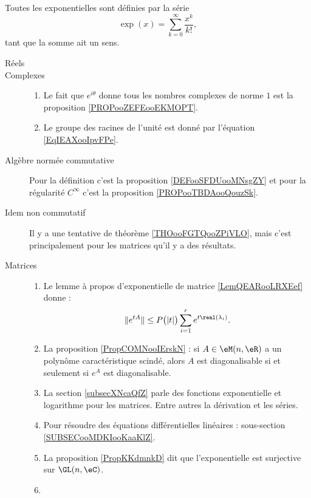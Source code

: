        \label{THEMEooKXSGooCsQNoY}

Toutes les exponentielles sont définies par la série
\begin{equation}
    \exp(x)=\sum_{k=0}^{\infty}\frac{ x^k }{ k! },
\end{equation}
tant que la somme ait un sens.

\begin{description}
    \item[Réels]

    \item[Complexes]

        \begin{enumerate}
            \item
                Le fait que \(  e^{i\theta}\) donne tous les nombres complexes de norme \( 1\) est la proposition \ref{PROPooZEFEooEKMOPT}.
            \item
                Le groupe des racines de l'unité est donné par l'équation \eqref{EqIEAXooIpvFPe}.
        \end{enumerate}

    \item[Algèbre normée commutative]

        Pour la définition c'est la proposition \ref{DEFooSFDUooMNsgZY} et pour la régularité \(  C^{\infty}\) c'est la proposition \ref{PROPooTBDAooQouzSk}.

    \item[Idem non commutatif]

        Il y a une tentative de théorème \ref{THOooFGTQooZPiVLO}, mais c'est principalement pour les matrices qu'il y a des résultats.

    \item[Matrices] 

\begin{enumerate}
    \item
            Le lemme à propos d'exponentielle de matrice \ref{LemQEARooLRXEef} donne :
            \begin{equation}
                \|  e^{tA} \|\leq P\big( | t | \big)\sum_{i=1}^r e^{t\real(\lambda_i)}.
            \end{equation}
        \item
            La proposition \ref{PropCOMNooIErskN} : si \( A\in \eM(n,\eR)\) a un polynôme caractéristique scindé, alors \( A\) est diagonalisable si et seulement si \( e^A\) est diagonalisable.
\item
    La section \ref{subsecXNcaQfZ} parle des fonctions exponentielle et logarithme pour les matrices. Entre autres la dérivation et les séries.
\item
    Pour résoudre des équations différentielles linéaires : sous-section \ref{SUBSECooMDKIooKaaKlZ}.
\item
    La proposition \ref{PropKKdmnkD} dit que l'exponentielle est surjective sur \( \GL(n,\eC)\).
\item


\end{enumerate}
\end{description}
